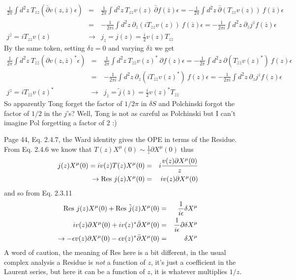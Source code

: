 \documentclass[aps,preprint,preprintnumbers,nofootinbib,showpacs,prd]{revtex4-1}
\newcommand{\nbea}{\begin{eqnarray*}}
\newcommand{\neea}{\end{eqnarray*}}
\begin{document}
%
\nbea
\frac{1}{2\pi} \int d^2 z ~ T_{zz} ( \bar \partial v(z,\bar z) \epsilon ) & = & \frac{1}{2\pi} \int d^2 z ~T_{zz} v(z) ~ \bar \partial f (\bar z) \epsilon = -\frac{1}{2\pi} \int d^2 z ~ \bar \partial (T_{zz} v(z)) ~ f (\bar z) \epsilon \\
& = & -\frac{1}{2\pi i} \int d^2 z ~ \partial_{\bar z} (i T_{zz} v (z)) ~ f (\bar z) \epsilon = - \frac{1}{2\pi i}\int d^2 z ~ \partial_{\bar z} j^{\bar z} f (\bar z) \epsilon\\
j^{\bar z} = i T_{zz} v (z) & \rightarrow & j_z = j(z) = \frac{i}{2} v (z) T_{zz}
\neea
%
By the same token, setting $\delta z = 0$ and varying $\delta \bar z$ we get
%
\nbea
\frac{1}{2\pi} \int d^2 z ~ T_{\bar z\bar z} ( \partial v(z,\bar z)^* \epsilon ) & = & \frac{1}{2\pi} \int d^2 z ~T_{\bar z\bar z} v(z)^* ~ \partial f (z) \epsilon = -\frac{1}{2\pi} \int d^2 z ~ \partial (T_{\bar z\bar z} v(z)^*) ~ f (z) \epsilon \\
& = & -\frac{1}{2\pi i} \int d^2 z ~ \partial_{z} (i T_{\bar z\bar z} v (z)^*) ~ f (z) \epsilon = - \frac{1}{2\pi i}\int d^2 z ~ \partial_{z} j^{z} f (z) \epsilon\\
j^{z} = i T_{\bar z\bar z} v (z)^* & \rightarrow & j_{\bar z} = \tilde j(\bar z) = \frac{i}{2} v (z)^* T_{\bar z\bar z}
\neea
%
So apparently Tong forget the factor of $1/2\pi$ in $\delta S$ and Polchinski forgot the factor of $1/2$ in the $j$'s? Well, Tong is not as careful as Polchinski but I can't imagine Pol forgetting a factor of 2 :)

Page 44, Eq. 2.4.7, the Ward identity gives the OPE in terms of the Residue. From Eq. 2.4.6 we know that $T(z) X^\mu(0) \sim \frac{1}{z} \partial X^\mu(0)$ thus
%
\nbea
j(z) X^\mu(0) = i v(z) T(z) X^\mu(0) & = & i\frac{v(z) \partial X^\mu(0)}{z} \\
\rightarrow {\rm Res~} j(z) X^\mu(0) & = & i v(z) \partial X^\mu(0)
\neea
%
and so from Eq. 2.3.11
%
\nbea
{\rm Res~} j(z) X^\mu(0) + {\rm Res~} \tilde j(\bar z) X^\mu(0) & = & \frac{1}{i\epsilon} \delta X^\mu \\
i v(z) \partial X^\mu(0) + i v(z)^* \bar \partial X^\mu(0) & = & \frac{1}{i\epsilon} \partial \delta X^\mu \\
\rightarrow -\epsilon v(z) \partial X^\mu(0) -\epsilon v(z)^* \bar \partial X^\mu(0) & = & \delta X^\mu
\neea
%
A word of caution, the meaning of Res here is a bit different, in the usual complex analysis a Residue is {\it not} a function of $z$, it's just a coefficient in the Laurent series, but here it can be a function of $z$, it is whatever multiplies $1/z$.
\end{document}
